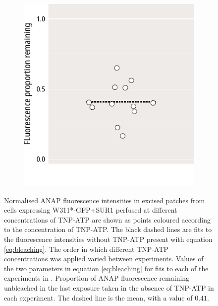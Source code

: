 \begin{figure}[hbtp]
\begin{subfigure}[t]{0.45\textwidth}
	\end{subfigure}
	\hfill
	\begin{subfigure}[t]{0.45\textwidth}
		\caption{}\label{ch3fig:bleaching_terms_2}
		\centering
		\includegraphics[width=\textwidth]{bleaching_terms_2.pdf}
	\end{subfigure}
	\caption[PCF bleaching correction]{
	 Normalised ANAP fluorescence intensities in excised patches from cells expressing W311*-GFP+SUR1 perfused at different concentrations of TNP-ATP are shown as points coloured according to the concentration of TNP-ATP.
	The black dashed lines are fits to the fluorescence intensities without TNP-ATP present with equation \ref{eq:bleaching}.
	The order in which different TNP-ATP concentrations was applied varied between experiments.
	 Values of the two parameters in equation \ref{eq:bleaching} for fits to each of the experiments in .
	 Proportion of ANAP fluorescence remaining unbleached in the last exposure taken in the absence of TNP-ATP in each experiment.
	The dashed line is the mean, with a value of $0.41$.
	}\label{ch3fig:pcf_bleaching}
\end{figure}

